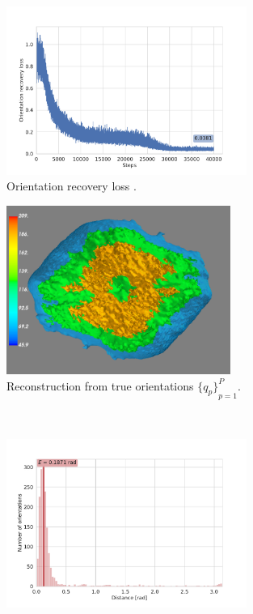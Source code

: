 \begin{figure}[ht!]
    \centering
    \begin{subfigure}[b]{0.45\textwidth}
        \centering
        \includegraphics[height=5.5cm]{figures/5a1a_noise0_angle_recovery}
        \caption{Orientation recovery loss .}
    \end{subfigure}
    \hfill
    \begin{subfigure}[b]{0.45\textwidth}
        \centering
        \includegraphics[height=5.5cm]{figures/5a1a_ground_truth}
        \caption{Reconstruction from true orientations ${\big\{q_p\big\}}_{p=1}^P$.}
    \end{subfigure}
    \\
    \begin{subfigure}[b]{0.45\textwidth}
        \centering
        \includegraphics[height=5.5cm]{figures/5a1a_noise0_angle_alignment_after}

\end{subfigure}
\end{figure}
